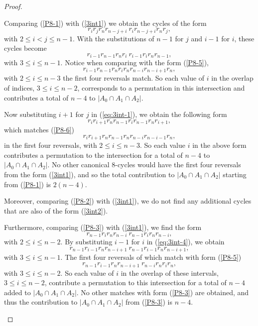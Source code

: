\documentclass[final]{dmtcs-episciences}
\numberwithin{equation}{section}
\begin{document}
\begin{proof}
\begin{description}
Comparing (\ref{P8-1}) with (\ref{3int1}) we obtain the cycles of the form \begin{equation}\label{eq:3int-1}
    r_i r_j r_n r_{n-j+i} \ r_i r_{n-j+i}r_n r_j,
\end{equation} with $2 \leq i < j \leq n-1$. 
With the substitutions of $n-1$ for $j$ and $i-1$ for $i$, these cycles become
\begin{equation*}
    r_{i-1} r_{n-1} r_{n} r_{i} \ r_{i-1} r_{i} r_{n} r_{n-1},
\end{equation*} with $3 \leq i \leq n-1$. Notice when comparing with the form (\ref{P8-5}),
\begin{equation*}
    r_{i-1}r_{n-1}r_n r_i r_n r_{n-i} r_{n-i+1} r_n, 
\end{equation*} with $2 \leq i \leq n-3$ the first four reversals match. So each value of $i$ in the overlap of indices, $3 \leq i \leq n-2$, corresponds to a permutation in this intersection and contributes a total of $n-4$ to $|A_0 \cap A_1 \cap A_2|$.

Now substituting $i+1$ for $j$ in (\ref{eq:3int-1}), we obtain the following form 
\begin{equation*}
r_{i} r_{i+1} r_{n} r_{n-1} r_{i} r_{n-1} r_{n} r_{i+1},
\end{equation*}
which matches (\ref{P8-6})
\begin{equation*}
r_i r_{i+1} r_n r_{n-1} r_n r_{n-i} r_{n-i-1} r_n,    
\end{equation*}
in the first four reversals, with $2 \leq i \leq n-3$. So each value $i$ in the above form contributes a permutation to the intersection for a total of $n-4$ to $|A_0 \cap A_1 \cap A_2|$. No other canonical 8-cycles would have the first four reversals from the form (\ref{3int1}), and so the total contribution to $|A_0 \cap A_1 \cap A_2|$ starting from (\ref{P8-1}) is $2(n-4)$.

Moreover, comparing (\ref{P8-2}) with (\ref{3int1}), we do not find any additional cycles that are also of the form (\ref{3int2}). 

Furthermore, comparing (\ref{P8-3}) with (\ref{3int1}), we find the form
\begin{equation}\label{eq:3int-4}
 r_{n-1}r_{i}r_{n}r_{n-i} \ r_{n-1}r_{i}r_{n}r_{n-i},   
\end{equation} with $2 \leq i \leq n-2$. By substituting $i-1$ for $i$ in (\ref{eq:3int-4}), we obtain 
\begin{equation*}
 r_{n-1}r_{i-1}r_{n}r_{n-i+1} \ r_{n-1}r_{i-1}r_{n}r_{n-i+1},
\end{equation*} with $3 \leq i \leq n-1$. The first four reversals of which match with form (\ref{P8-5})
\begin{equation*}
r_{n-1}r_{i-1}r_{n}r_{n-i+1}\ r_{n-i}r_{n}r_{i}r_{n},    
\end{equation*} with $3 \leq i \leq n-2$. So each value of $i$ in the overlap of these intervals, $3 \leq i \leq n-2$, contribute a permutation to this intersection for a total of $n-4$ added to $|A_0 \cap A_1 \cap A_2|$. No other matches with form (\ref{P8-3}) are obtained, and thus the contribution to $|A_0 \cap A_1 \cap A_2|$ from (\ref{P8-3}) is $n-4$.


\end{description}
\end{proof}
\end{document}
